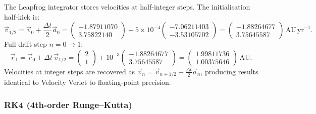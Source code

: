 The Leapfrog integrator stores velocities at half-integer steps.
The initialisation half-kick is:
\begin{equation*}
    \vec{v}_{1/2} = \vec{v}_0 + \frac{\Delta t}{2}\vec{a}_0
    = \begin{pmatrix}-1.87911070\\3.75822140\end{pmatrix}
    + 5\times10^{-4}\begin{pmatrix}-7.06211403\\-3.53105702\end{pmatrix}
    = \begin{pmatrix}-1.88264677\\3.75645587\end{pmatrix}\,\mathrm{AU\,yr}^{-1}.
\end{equation*}
Full drift step $n = 0 \to 1$:
\begin{equation*}
    \vec{r}_1 = \vec{r}_0 + \Delta t\,\vec{v}_{1/2}
    = \begin{pmatrix}2\\1\end{pmatrix}
    + 10^{-3}\begin{pmatrix}-1.88264677\\3.75645587\end{pmatrix}
    = \begin{pmatrix}1.99811736\\1.00375646\end{pmatrix}\,\mathrm{AU}.
\end{equation*}
Velocities at integer steps are recovered as $\vec{v}_n = \vec{v}_{n+1/2} - \tfrac{\Delta t}{2}\vec{a}_n$,
producing results identical to Velocity Verlet to floating-point precision.

\subsubsection*{RK4 (4th-order Runge--Kutta)}

